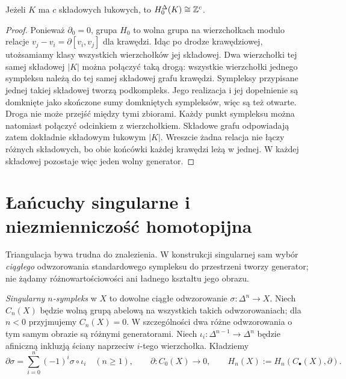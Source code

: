 \begin{stwierdzenie}[Składowe i $H_0$]
\label{prop:h0-symplicjalne}
Jeżeli $K$ ma $c$ składowych łukowych,
to $H_0^\Delta(K)\cong\mathbb{Z}^c$.
\end{stwierdzenie}
\begin{proof}
Ponieważ $\partial_0=0$, grupa $H_0$
to wolna grupa na wierzchołkach
modulo relacje
$v_j-v_i=\partial[v_i,v_j]$
dla krawędzi. Idąc po drodze krawędziowej,
utożsamiamy klasy wszystkich wierzchołków
jej składowej. Dwa wierzchołki tej samej
składowej $|K|$ można połączyć taką drogą:
wszystkie wierzchołki jednego sympleksu należą do tej samej
składowej grafu krawędzi. Sympleksy przypisane jednej takiej
składowej tworzą podkompleks. Jego realizacja i jej dopełnienie
są domknięte jako skończone sumy domkniętych sympleksów,
więc są też otwarte. Droga nie może przejść między tymi zbiorami.
Każdy punkt sympleksu można natomiast połączyć odcinkiem z wierzchołkiem.
Składowe grafu odpowiadają zatem dokładnie składowym łukowym $|K|$. Wreszcie żadna
relacja nie łączy różnych składowych,
bo obie końcówki każdej krawędzi leżą
w jednej. W każdej składowej pozostaje
więc jeden wolny generator.
\end{proof}

\section{Łańcuchy singularne i niezmienniczość homotopijna}
\label{sec:homologia-singularna}

Triangulacja bywa trudna do znalezienia. W konstrukcji
singularnej sam wybór \emph{ciągłego} odwzorowania
standardowego sympleksu do przestrzeni tworzy
generator; nie żądamy różnowartościowości ani
ładnego kształtu jego obrazu.

\begin{definicja}
\label{def:homologia-singularna}
\emph{Singularny $n$-sympleks} w $X$ to dowolne
ciągłe odwzorowanie $\sigma:\Delta^n\to X$.
Niech $C_n(X)$ będzie wolną grupą abelową
na wszystkich takich odwzorowaniach; dla $n<0$ przyjmujemy $C_n(X)=0$.
W szczególności
dwa różne odwzorowania o tym samym obrazie są
różnymi generatorami. Niech
$\iota_i:\Delta^{n-1}\to\Delta^n$
będzie afiniczną inkluzją ściany
naprzeciw $i$-tego wierzchołka. Kładziemy
\begin{equation}\label{eq:singular-boundary}
 \partial\sigma=\sum_{i=0}^n(-1)^i
 \sigma\circ\iota_i\quad(n\geq1),
 \qquad \partial:C_0(X)\to0,
 \qquad H_n(X):=H_n(C_\bullet(X),\partial).
\end{equation}
\end{definicja}

